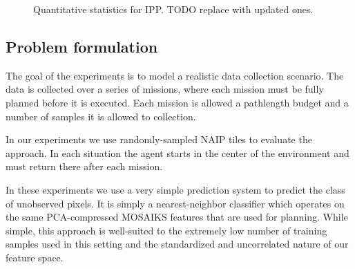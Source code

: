 \begin{figure}[h]
    \hfill
    \hfill
    \caption{Quantitative statistics for IPP. TODO replace with updated ones.}
    \label{fig:res_ipp_quant}
\end{figure}

\subsection{Problem formulation}
The goal of the experiments is to model a realistic data collection scenario. The data is collected over a series of missions, where each mission must be fully planned before it is executed. Each mission is allowed a pathlength budget and a number of samples it is allowed to collection. 

In our experiments we use randomly-sampled NAIP tiles to evaluate the approach. In each situation the agent starts in the center of the environment and must return there after each mission.

In these experiments we use a very simple prediction system to predict the class of unobserved pixels. It is simply a nearest-neighbor classifier which operates on the same PCA-compressed MOSAIKS features that are used for planning. While simple, this approach is well-suited to the extremely low number of training samples used in this setting and the standardized and uncorrelated nature of our feature space.

